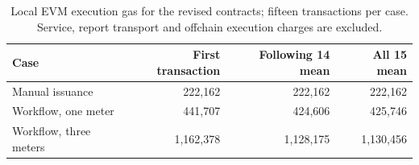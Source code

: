 \begin{table}[tb]\centering\small
\caption{Local EVM execution gas for the revised contracts; fifteen transactions per case. Service, report transport and offchain execution charges are excluded.}\label{tab:gasv2}
\begin{tabular}{@{}lrrr@{}}\toprule
Case & First transaction & Following 14 mean & All 15 mean\\\midrule
Manual issuance & 222,162 & 222,162 & 222,162\\
Workflow, one meter & 441,707 & 424,606 & 425,746\\
Workflow, three meters & 1,162,378 & 1,128,175 & 1,130,456\\
\bottomrule\end{tabular}\end{table}
